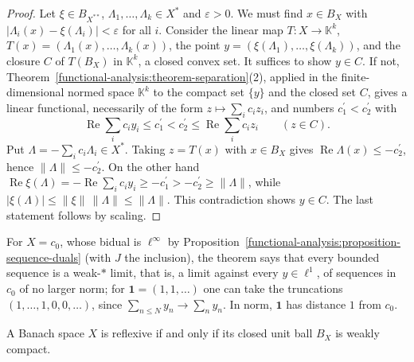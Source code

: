 \begin{proof}
Let $\xi \in B_{X^{**}}$, $\Lambda_1, \ldots, \Lambda_k \in X^*$ and $\varepsilon > 0$. We must find $x \in B_X$ with $|\Lambda_i(x) - \xi(\Lambda_i)| < \varepsilon$ for all $i$. Consider the linear map
$T \colon X \to \mathbb{K}^k$, $T(x) = (\Lambda_1(x), \ldots, \Lambda_k(x))$, the point $y = (\xi(\Lambda_1), \ldots, \xi(\Lambda_k))$, and the closure $C$ of $T(B_X)$ in $\mathbb{K}^k$, a closed convex set. It suffices to show
$y \in C$. If not, Theorem~\ref{functional-analysis:theorem-separation}(2), applied in the finite-dimensional normed space $\mathbb{K}^k$ to the compact set $\{y\}$ and the closed set $C$, gives a linear functional,
necessarily of the form $z \mapsto \sum_ic_iz_i$, and numbers $c_1^{\prime} < c_2^{\prime}$ with
\[
\operatorname{Re}\sum_ic_iy_i \leq c_1^{\prime} < c_2^{\prime} \leq \operatorname{Re}\sum_ic_iz_i \qquad (z \in C).
\]
Put $\Lambda = -\sum_ic_i\Lambda_i \in X^*$. Taking $z = T(x)$ with $x \in B_X$ gives $\operatorname{Re}\Lambda(x) \leq -c_2^{\prime}$, hence $\|\Lambda\| \leq -c_2^{\prime}$. On the other hand
$\operatorname{Re}\xi(\Lambda) = -\operatorname{Re}\sum_ic_iy_i \geq -c_1^{\prime} > -c_2^{\prime} \geq \|\Lambda\|$, while $|\xi(\Lambda)| \leq \|\xi\|\,\|\Lambda\| \leq \|\Lambda\|$. This contradiction shows $y \in C$. The last statement
follows by scaling.
\end{proof}

For $X = c_0$, whose bidual is $\ell^\infty$ by Proposition~\ref{functional-analysis:proposition-sequence-duals} (with $J$ the inclusion), the theorem says that every bounded sequence is a weak-$*$ limit,
that is, a limit against every $y \in \ell^1$, of sequences in $c_0$ of no larger norm; for $\mathbf{1} = (1, 1, \ldots)$ one can take the truncations $(1, \ldots, 1, 0, 0, \ldots)$, since
$\sum_{n \leq N}y_n \to \sum_ny_n$. In norm, $\mathbf{1}$ has distance $1$ from $c_0$.

\begin{theorem}[Kakutani]\label{functional-analysis:theorem-kakutani}
A Banach space $X$ is reflexive if and only if its closed unit ball $B_X$ is weakly compact.
\end{theorem}

